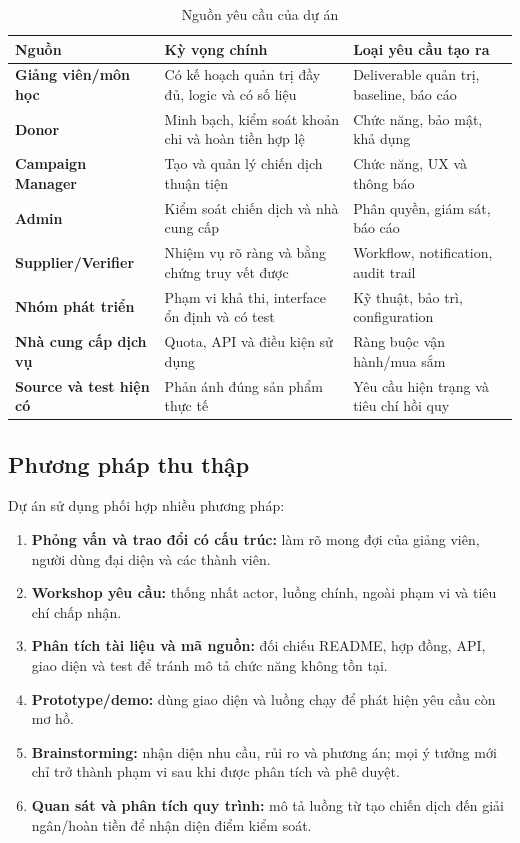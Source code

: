 \begin{table}[H]
\centering
\caption{Nguồn yêu cầu của dự án}
\label{tab:requirement-sources}
\begin{tabularx}{\textwidth}{| >{\bfseries}p{3.6cm} | p{5.1cm} | X |}
\hline
Nguồn & Kỳ vọng chính & Loại yêu cầu tạo ra \\
\hline
Giảng viên/môn học & Có kế hoạch quản trị đầy đủ, logic và có số liệu & Deliverable quản trị, baseline, báo cáo \\ \hline
Donor & Minh bạch, kiểm soát khoản chi và hoàn tiền hợp lệ & Chức năng, bảo mật, khả dụng \\ \hline
Campaign Manager & Tạo và quản lý chiến dịch thuận tiện & Chức năng, UX và thông báo \\ \hline
Admin & Kiểm soát chiến dịch và nhà cung cấp & Phân quyền, giám sát, báo cáo \\ \hline
Supplier/Verifier & Nhiệm vụ rõ ràng và bằng chứng truy vết được & Workflow, notification, audit trail \\ \hline
Nhóm phát triển & Phạm vi khả thi, interface ổn định và có test & Kỹ thuật, bảo trì, configuration \\ \hline
Nhà cung cấp dịch vụ & Quota, API và điều kiện sử dụng & Ràng buộc vận hành/mua sắm \\ \hline
Source và test hiện có & Phản ánh đúng sản phẩm thực tế & Yêu cầu hiện trạng và tiêu chí hồi quy \\
\hline
\end{tabularx}
\end{table}

\subsection{Phương pháp thu thập}

Dự án sử dụng phối hợp nhiều phương pháp:

\begin{enumerate}
  \item \textbf{Phỏng vấn và trao đổi có cấu trúc:} làm rõ mong đợi của giảng viên, người dùng đại diện và các thành viên.
  \item \textbf{Workshop yêu cầu:} thống nhất actor, luồng chính, ngoài phạm vi và tiêu chí chấp nhận.
  \item \textbf{Phân tích tài liệu và mã nguồn:} đối chiếu README, hợp đồng, API, giao diện và test để tránh mô tả chức năng không tồn tại.
  \item \textbf{Prototype/demo:} dùng giao diện và luồng chạy để phát hiện yêu cầu còn mơ hồ.
  \item \textbf{Brainstorming:} nhận diện nhu cầu, rủi ro và phương án; mọi ý tưởng mới chỉ trở thành phạm vi sau khi được phân tích và phê duyệt.
  \item \textbf{Quan sát và phân tích quy trình:} mô tả luồng từ tạo chiến dịch đến giải ngân/hoàn tiền để nhận diện điểm kiểm soát.
\end{enumerate}

